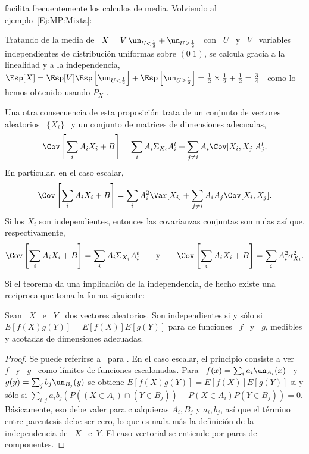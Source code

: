   facilita
frecuentemente los calculos de media.  Volviendo al ejemplo~\ref{Ej:MP:Mixta}:
%
\begin{ejemplo}
\label{Ej:EspMixtaInd}
%
Tratando de la media  de \ $X = V \, \un_{U < \frac12}  + \un_{U \ge \frac12}$ \
con \ $U$ \ y \ $V$ \ variables independientes de distribuci\'on uniformas sobre
$(0 \; 1)$, se calcula gracia a la linealidad y a la independencia, \ $\Esp[X] =
\Esp[V] \Esp\left[  \un_{U < \frac12}  \right] + \Esp\left[ \un_{U  \ge \frac12}
\right] = \frac12  \times \frac12 + \frac12 = \frac34$ \  como lo hemos obtenido
usando   $P_X$   \modif{en   Ej.~\ref{Ej:MP:EspMixta}   o  la   positividad   en
  Ej.~\ref{Ej:MP:EspMixtaPositiva}}.
\end{ejemplo}

Una otra  consecuencia de  esta proposici\'on trata  de un conjunto  de vectores
aleatorios \ $\{ X_i \}$ \ y un conjunto de matrices de dimensiones adecuadas,
%
\[
\Cov\left[ \sum_i A_i X_i + B\right] =  \sum_i A_i \Sigma_{X_i} A_i^t + \sum_{j \ne
  i} A_i \Cov[X_i,X_j] A_j^t.
\]
%
En particular, en el caso escalar,
%
\[
\Cov\left[ \sum_i A_i X_i + B \right]  = \sum_i A_i^2 \Var[X_i] + \sum_{j \ne i}
A_i A_j \Cov[X_i,X_j].
\]
%
Si los  $X_i$ son independientes,  entonces las covarianzas conjuntas  son nulas
as\'i que, respectivamente,
%
\[
\Cov\left[ \sum_i  A_i X_i +  B \right] =  \sum_i A_i \Sigma_{X_i}  A_i^t \qquad
\mbox{y}  \qquad  \Cov\left[  \sum_i  A_i   X_i  +  B  \right]  =  \sum_i  A_i^2
\sigma_{X_i}^2.
\]

Si el  teorema da  una implicaci\'on  de la independencia,  de hecho  existe una
reciproca que toma la forma siguiente:
%
\begin{teorema}
\label{Teo:MP:IndependenciaMomentos}
%
Sean \ $X$ \  e \ $Y$ \ dos vectores aleatorios.  Son independientes si y s\'olo
si $E[f(X) g(Y)]=E[f(X)] E[g(Y)]$ para  \modif{todos pares} de funciones \ $f$ \
y \ $g$, medibles y acotadas de dimensiones adecuadas.
\end{teorema}
%
\begin{proof}
  Se puede referirse a~\cite{Fel71,  JacPro03} para .
  En  el caso  escalar, el  principio consiste  a ver  \ $f$  \ y  \ $g$  \ como
  l\'imites de funciones escalonadas. Para  \ $f(x) = \sum_i a_i \un_{A_i}(x)$ \
  y \ $g(y) = \sum_j b_j \un_{B_j}(y)$ se obtiene $E[f(X) g(Y)]=E[f(X)] E[g(Y)]$
  si y s\'olo si  $\sum_{i,j} a_i b_j \left( P( (X \in A_i)  \cap (Y \in B_j)) -
    P(X \in A_i) P(Y \in B_j)  \right) = 0$.  B\'asicamente, eso debe valer para
  cualquieras $A_i, B_j$  y $a_i, b_j$, as\'i que  el t\'ermino entre parentesis
  debe  ser  cero, lo  que  es  nada m\'as  \modif{que}  la  definici\'on de  la
  independencia de \ $X$  \ e\ $Y$.  El caso vectorial se  entiende por pares de
  componentes.
\end{proof}

